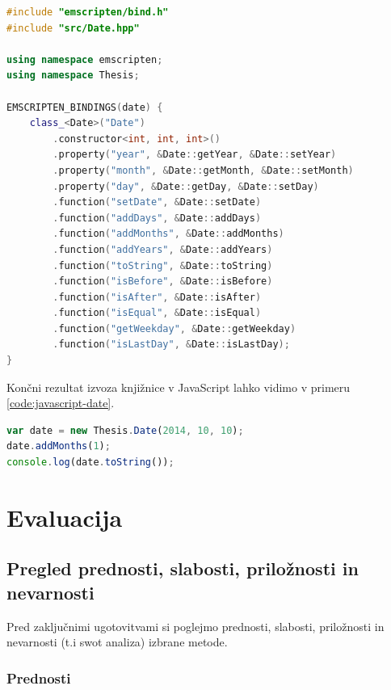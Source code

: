 \begin{lstlisting}[caption={C++ koda za izvoz funckionalnosti knjižnice v JavaScript razreda \texttt{Date}.}, label=code:emscripten-bindings, language=c++]
#include "emscripten/bind.h"
#include "src/Date.hpp"

using namespace emscripten;
using namespace Thesis;

EMSCRIPTEN_BINDINGS(date) {
    class_<Date>("Date")
        .constructor<int, int, int>()
        .property("year", &Date::getYear, &Date::setYear)
        .property("month", &Date::getMonth, &Date::setMonth)
        .property("day", &Date::getDay, &Date::setDay)
        .function("setDate", &Date::setDate)
        .function("addDays", &Date::addDays)
        .function("addMonths", &Date::addMonths)
        .function("addYears", &Date::addYears)
        .function("toString", &Date::toString)
        .function("isBefore", &Date::isBefore)
        .function("isAfter", &Date::isAfter)
        .function("isEqual", &Date::isEqual)
        .function("getWeekday", &Date::getWeekday)
        .function("isLastDay", &Date::isLastDay);
}
\end{lstlisting}

Končni rezultat izvoza knjižnice v JavaScript lahko vidimo v primeru \ref{code:javascript-date}.

\begin{lstlisting}[caption={Primer uporabe izvoženega razreda \texttt{Date} v JavaScript.}, label=code:javascript-date, language=JavaScript]
var date = new Thesis.Date(2014, 10, 10);
date.addMonths(1);
console.log(date.toString());
\end{lstlisting}


\chapter{Evaluacija}
\label{chap:evaluation}

\section{Pregled prednosti, slabosti, priložnosti in nevarnosti}

Pred zaključnimi ugotovitvami si poglejmo prednosti, slabosti, priložnosti in nevarnosti (t.i \gls{swot} analiza) izbrane metode.

\subsection{Prednosti}

